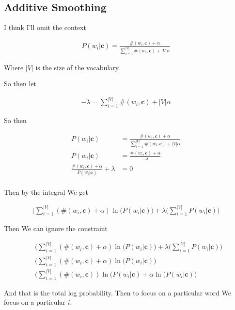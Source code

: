 \documentclass{article}
\newcommand{\context}{\boldsymbol{c}}
\begin{document}
	\subsection{Additive Smoothing}
	
		I think I'll omit the context 
		
		\begin{align}
			P(w_i|\context) = \frac{\#(w_i, \context) + \alpha}{\sum^{|V|}_{i=1} \#(w_i, \context) + |V|\alpha }
		\end{align}
			
		Where $|V|$ is the size of the vocabulary.
		
		So then let
		
		\begin{align}
			-\lambda = \sum^{|V|}_{i=1} \#(w_i, \context) + |V|\alpha
		\end{align}

		So then
		
		\begin{align}
			P(w_i|\context) &= \frac{\#(w_i, \context) + \alpha}{\sum^{|V|}_{i=1} \#(w_i, \context) + |V|\alpha }\\
			P(w_i|\context) &= \frac{\#(w_i, \context) + \alpha}{-\lambda}\\
			\frac{\#(w_i, \context) + \alpha}{P(w_i|\context)} + \lambda &= 0\\
		\end{align}
			
		Then by the integral We get
		
		\begin{align}
			\bigg( \sum^{|V|}_{i=1} (\#(w_i, \context) + \alpha)\ln(P(w_i|\context)\bigg) + \lambda\bigg(\sum^{|V|}_{i=1} P(w_i|\context) \bigg)
		\end{align}
		
		Then We can ignore the constraint
		
		\begin{align}
			&\bigg( \sum^{|V|}_{i=1} (\#(w_i, \context) + \alpha)\ln(P(w_i|\context)\bigg) + \lambda\bigg(\sum^{|V|}_{i=1} P(w_i|\context) \bigg)\\
			&\bigg( \sum^{|V|}_{i=1} (\#(w_i, \context) + \alpha)\ln(P(w_i|\context)\bigg) \\
			& \bigg( \sum^{|V|}_{i=1} (\#(w_i, \context) )\ln(P(w_i|\context) + \alpha\ln(P(w_i|\context)\bigg) 
		\end{align}
		
		And that is the total log probability. Then to focus on a particular word We focus on a particular $i$:
		
\end{document}
